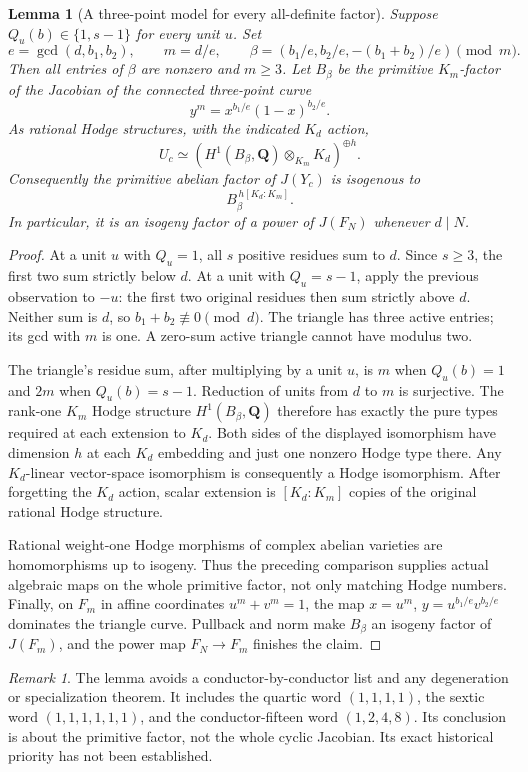 \documentclass[11pt]{article}
\newtheorem{lemma}[theorem]{Lemma}
\theoremstyle{remark}\newtheorem{remark}[theorem]{Remark}
\newcommand{\Q}{\mathbf Q}\newcommand{\C}{\mathbf C}
\begin{document}
\begin{lemma}[A three-point model for every all-definite factor]
\label{lem:triangle}
Suppose $Q_u(b)\in\{1,s-1\}$ for every unit $u$. Set
\[
 e=\gcd(d,b_1,b_2),\qquad m=d/e,
 \qquad \beta=(b_1/e,b_2/e,-(b_1+b_2)/e)\pmod m.
\]
Then all entries of $\beta$ are nonzero and $m\geq3$. Let $B_\beta$ be
the primitive $K_m$-factor of the Jacobian of the connected three-point
curve
\[
 y^m=x^{b_1/e}(1-x)^{b_2/e}.
\]
As rational Hodge structures, with the indicated $K_d$ action,
\[
 U_c\simeq
 \left(H^1(B_\beta,\Q)\otimes_{K_m}K_d\right)^{\oplus h}.
\]
Consequently the primitive abelian factor of $J(Y_c)$ is isogenous to
\[
 B_\beta^{\,h[K_d:K_m]}.
\]
In particular, it is an isogeny factor of a power of $J(F_N)$ whenever
$d\mid N$.
\end{lemma}
\begin{proof}
At a unit $u$ with $Q_u=1$, all $s$ positive residues sum to $d$.
Since $s\geq3$, the first two sum strictly below $d$. At a unit with
$Q_u=s-1$, apply the previous observation to $-u$: the first two original
residues then sum strictly above $d$. Neither sum is $d$, so
$b_1+b_2\not\equiv0\pmod d$. The triangle has three active entries;
its gcd with $m$ is one. A zero-sum active triangle cannot have modulus two.

The triangle's residue sum, after multiplying by a unit $u$, is $m$
when $Q_u(b)=1$ and $2m$ when $Q_u(b)=s-1$. Reduction of units from $d$
to $m$ is surjective. The rank-one $K_m$ Hodge structure
$H^1(B_\beta,\Q)$ therefore has exactly the pure types required at each
extension to $K_d$. Both sides of the displayed isomorphism have dimension
$h$ at each $K_d$ embedding and just one nonzero Hodge type there.
Any $K_d$-linear vector-space isomorphism is consequently a Hodge
isomorphism. After forgetting the $K_d$ action, scalar extension is
$[K_d:K_m]$ copies of the original rational Hodge structure.

Rational weight-one Hodge morphisms of complex abelian varieties are
homomorphisms up to isogeny. Thus the preceding comparison supplies actual
algebraic maps on the whole primitive factor, not only matching Hodge
numbers. Finally, on $F_m$ in affine coordinates $u^m+v^m=1$, the map
$x=u^m$, $y=u^{b_1/e}v^{b_2/e}$ dominates the triangle curve. Pullback and
norm make $B_\beta$ an isogeny factor of $J(F_m)$, and the power map
$F_N\to F_m$ finishes the claim.
\end{proof}

\begin{remark}
The lemma avoids a conductor-by-conductor list and any degeneration or
specialization theorem. It includes the quartic word $(1,1,1,1)$, the
sextic word $(1,1,1,1,1,1)$, and the conductor-fifteen word $(1,2,4,8)$.
Its conclusion is about the primitive factor, not the whole cyclic
Jacobian. Its exact historical priority has not been established.
\end{remark}
\end{document}
